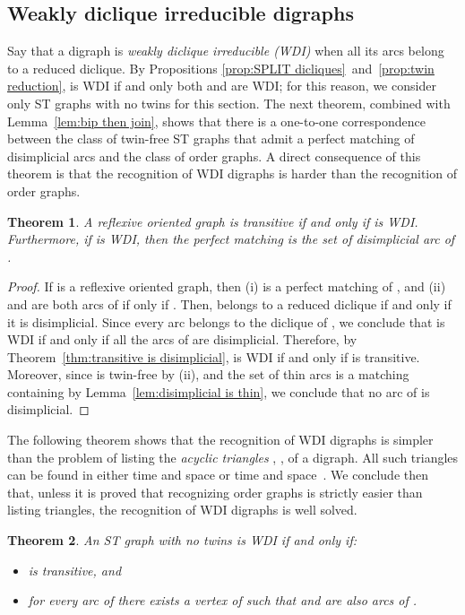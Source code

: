 \documentclass[a4paper,11pt]{article}
\newtheorem{theorem}{Theorem}
\begin{document}
\subsection{Weakly diclique irreducible digraphs}

Say that a digraph is \emph{weakly diclique irreducible (WDI)} when all its arcs belong to a reduced diclique.  By Propositions \ref{prop:SPLIT dicliques}~and~\ref{prop:twin reduction},  is WDI if and only both  and  are WDI; for this reason, we consider only ST graphs with no twins for this section.  The next theorem, combined with Lemma~\ref{lem:bip then join}, shows that there is a one-to-one correspondence between the class of twin-free ST graphs that admit a perfect matching of disimplicial arcs and the class of order graphs.  A direct consequence of this theorem is that the recognition of WDI digraphs is harder than the recognition of order graphs.

\begin{theorem}
 A reflexive oriented graph  is transitive if and only if  is WDI.  Furthermore, if  is WDI, then the perfect matching  is the set of disimplicial arc of .
\end{theorem}

\begin{proof}
 If  is a reflexive oriented graph, then (i)  is a perfect matching of , and (ii)  and  are both arcs of  if only if .  Then,  belongs to a reduced diclique if and only if it is disimplicial.  Since every arc  belongs to the diclique  of , we conclude that  is WDI if and only if all the arcs of  are disimplicial.  Therefore, by Theorem~\ref{thm:transitive is disimplicial},  is WDI if and only if  is transitive.  Moreover, since  is twin-free by (ii), and the set of thin arcs is a matching containing  by Lemma~\ref{lem:disimplicial is thin}, we conclude that no arc of  is disimplicial.
\end{proof}

The following theorem shows that the recognition of WDI digraphs is simpler than the problem of listing the \emph{acyclic triangles} , ,  of a digraph.  All such triangles can be found in either  time and  space or  time and  space~\cite{ChibaNishizekiSJC1985}.  We conclude then that, unless it is proved that recognizing order graphs is strictly easier than listing triangles, the recognition of WDI digraphs is well solved. 

\begin{theorem}\label{thm:WDI characterization}
  An ST graph  with no twins is WDI if and only if:
  \begin{itemize}
   \item  is transitive, and 
   \item for every arc  of  there exists a vertex  of  such that  and  are also arcs of .   
  \end{itemize}
\end{theorem}
\end{document}
